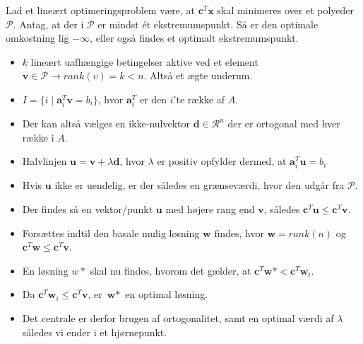 \begin{frame}
Lad et lineært optimeringsproblem være, at $\textbf{c}^T \textbf{x}$ skal minimeres over et polyeder $\mathcal{P}$. 
Antag, at der i $\mathcal{P}$ er mindst ét ekstremumspunkt. 
Så er den optimale omkostning lig $- \infty$, eller også findes et optimalt ekstremumspunkt.
\end{frame}

\begin{frame}
\begin{itemize}
\item $k$ lineært uafhængige betingelser aktive ved et element $\textbf{v}\in \mathcal{P} \rightarrow rank(v)=k < n$. Altså et ægte underum.
\item $I = \{ i \mid \textbf{a}^T_i \textbf{v} = b_i \}$, hvor $\textbf{a}^T_i$ er den $i$'te række af $A$.
\item  Der kan altså vælges en ikke-nulvektor $\textbf{d} \in \mathcal{R}^n$ der er ortogonal med hver række i $A$.
\item Halvlinjen $\textbf{u}=\textbf{v}+ \lambda \textbf{d}$, hvor $\lambda$ er positiv opfylder dermed, at $\textbf{a}^T_i \textbf{u} = b_i$
\end{itemize}
\end{frame}
\begin{frame}
\begin{itemize}
\item Hvis $\textbf{u}$ ikke er uendelig, er der således en grænseværdi, hvor den udgår fra $\mathcal{P}$.
\item Der findes så en vektor/punkt $\textbf{u}$ med højere rang end $\textbf{v}$, således $\textbf{c}^T \textbf{u} \leq \textbf{c}^T \textbf{v}$.
\item Forsættes indtil den basale mulig løsning $\textbf{w}$ findes, hvor $\textbf{w}=rank(n)$ og $\textbf{c}^T \textbf{w} \leq \textbf{c}^T \textbf{v}$.
\end{itemize}
\end{frame}
\begin{frame}
\begin{itemize}
\item En løsning $w*$ skal nu findes, hvorom det gælder, at $\textbf{c}^T\textbf{w}*<\textbf{c}^T \textbf{w}_i$.
\item Da $\textbf{c}^T \textbf{w}_i \leq \textbf{c}^T \textbf{v}$, er $\textbf{w}*$ en optimal løsning.
\item Det centrale er derfor brugen af ortogonalitet, samt en optimal værdi af $\lambda$ således vi ender i et hjørnepunkt.
\end{itemize}
\end{frame}

